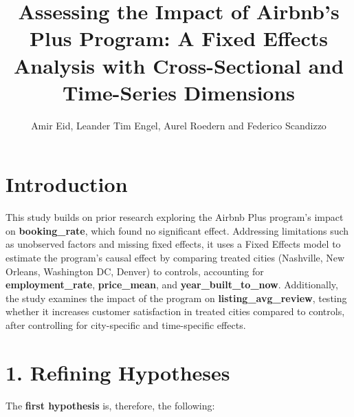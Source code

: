 \documentclass[
  12pt,
]{article}
\title{Assessing the Impact of Airbnb's Plus Program: A Fixed Effects
Analysis with Cross-Sectional and Time-Series Dimensions}
\author{Amir Eid, Leander Tim Engel, Aurel Roedern and Federico
Scandizzo}
\date{}
\begin{document}
\maketitle

\section{Introduction}\label{introduction}

This study builds on prior research exploring the Airbnb Plus program's
impact on \textbf{booking\_rate}, which found no significant effect.
Addressing limitations such as unobserved factors and missing fixed
effects, it uses a Fixed Effects model to estimate the program's causal
effect by comparing treated cities (Nashville, New Orleans, Washington
DC, Denver) to controls, accounting for \textbf{employment\_rate},
\textbf{price\_mean}, and \textbf{year\_built\_to\_now}. Additionally,
the study examines the impact of the program on
\textbf{listing\_avg\_review}, testing whether it increases customer
satisfaction in treated cities compared to controls, after controlling
for city-specific and time-specific effects.

\section{1. Refining Hypotheses}\label{refining-hypotheses}

The \textbf{first hypothesis} is, therefore, the following:
\end{document}
